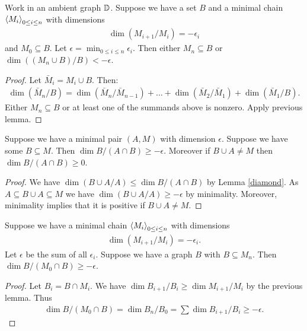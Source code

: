 \begin{Lemma}	\label{chain_lemma}
  Work in an ambient graph $\mathbb D$.
  Suppose we have a set $B$ and a minimal chain  $\left\langle M_i \right\rangle_{0 \leq i \leq n}$ with dimensions
  \begin{align*}
    \dim(M_{i+1}/M_i) = -\epsilon_i
  \end{align*}
  and $M_0 \subseteq B$.
  Let $\epsilon = \min_{0 \leq i \leq n} \epsilon_i$.
  Then either $M_n \subseteq B$ or $\dim((M_n \cup B)/B) < -\epsilon$.
\end{Lemma}

\begin{proof}
  Let $\bar M_i = M_i \cup B$. Then:
  \begin{align*}
    \dim(\bar M_n/B) = \dim(\bar M_n/\bar M_{n-1}) + \ldots + \dim(\bar M_2/\bar M_1) + \dim(\bar M_1/B).
  \end{align*}
  Either $M_n \subseteq B$ or at least one of the summands above is nonzero.
  Apply previous lemma.
\end{proof}

\begin{Lemma} \label{minimal_subset}
  Suppose we have a minimal pair $(A, M)$ with dimension $\epsilon$.
  Suppose we have some $B \subseteq M$.
  Then $\dim B / (A \cap B) \geq -\epsilon$.
  Moreover if $B \cup A \neq M$ then $\dim B / (A \cap B) \geq 0$.
\end{Lemma}

\begin{proof}
  We have $\dim (B \cup A / A) \leq \dim B / (A \cap B)$ by Lemma \ref{diamond}.
  As $A \subseteq B \cup A \subseteq M$ we have $\dim (B \cup A / A) \geq -\epsilon$ by minimality.
  Moreover, minimality implies that it is positive if $B \cup A \neq M$.
\end{proof}

\begin{Lemma} \label{chain_intersect}
  Suppose we have a minimal chain  $\left\langle M_i \right\rangle_{0 \leq i \leq n}$ with dimensions
  \begin{align*}
    \dim(M_{i+1}/M_i) = -\epsilon_i.
  \end{align*}
  Let $\epsilon$ be the sum of all $\epsilon_i$.
  Suppose we have a graph $B$ with $B \subseteq M_n$.
  Then $\dim B / (M_0 \cap B) \geq -\epsilon$.
\end{Lemma}

\begin{proof}
  Let $B_i = B \cap M_i$.
  We have $\dim B_{i+1}/B_i \geq \dim M_{i+1}/M_i$ by the previous lemma.
  Thus
  \begin{align*}
    \dim B / (M_0 \cap B) = \dim B_n / B_0 = \sum \dim B_{i+1}/B_i \geq -\epsilon.
  \end{align*}
\end{proof}

